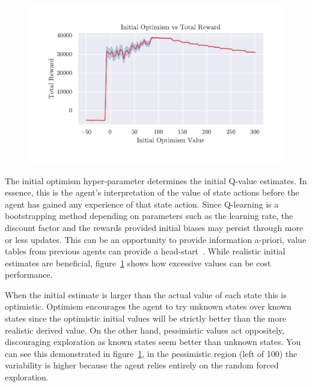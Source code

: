 \documentclass[]{final_report}
\begin{document}
\begin{figure}[H]
  \centering
  
  \includegraphics[trim={0 1cm 0 1cm},clip, width=\textwidth]{hyper-paramiters/inital-optimism}
  
  \caption{\label{fig:inital-optimism}}
\end{figure}


The initial optimism hyper-parameter determines the initial Q-value estimates. In essence, this is the agent's interpretation of the value of state actions before the agent has gained any experience of that state action. Since Q-learning is a bootstrapping method depending on parameters such as the learning rate, the discount factor and the rewards provided initial biases may persist through more or less updates. This can be an opportunity to provide information a-priori, value tables from previous agents can provide a head-start~\cite{deathTransfer}. While realistic initial estimates are beneficial, figure~\ref{fig:inital-optimism} shows how excessive values can be cost performance. 

When the initial estimate is larger than the actual value of each state this is optimistic. Optimism encourages the agent to try unknown states over known states since the optimistic initial values will be strictly better than the more realistic derived value. On the other hand, pessimistic values act oppositely, discouraging exploration as known states seem better than unknown states. You can see this demonstrated in figure~\ref{fig:inital-optimism}, in the pessimistic region (left of 100) the variability is higher because the agent relies entirely on the random forced exploration. 
\end{document}
